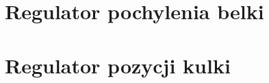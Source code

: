 

\section{Regulator pochylenia belki}
\label{sec:ch5_regulator_belki}

\section{Regulator pozycji kulki}
\label{sec:ch5_regulator_kulki}

